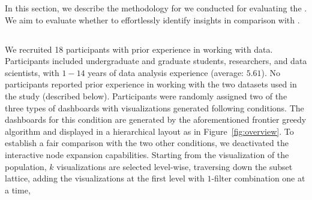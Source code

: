 In this section, we describe the methodology
for 
we conducted for evaluating the
.
We aim to evaluate whether to effortlessly identify insights in comparison
with .%
\subsection{}
We recruited 18 participants 
with prior experience in working with data.
Participants included undergraduate
and graduate students, researchers,
and data scientists, with $1-14$ years of data
analysis experience (average: $5.61$).
No participants reported prior experience
in working with the two datasets used in the study (described below).
Participants were randomly assigned two
of the three types of dashboards with 
visualizations generated 
following conditions.
\stitle{\system:} The dashboards for this condition
are generated by the aforementioned
frontier greedy algorithm and displayed
in a hierarchical layout as in Figure~\ref{fig:overview}.
To establish a fair comparison
with the two other conditions,
we deactivated 
the interactive node expansion capabilities.
Starting from the visualization of the  population,
$k$ visualizations are selected level-wise,
traversing down the subset lattice,
adding the visualizations at the first level
with $1$-filter combination one at a time,
